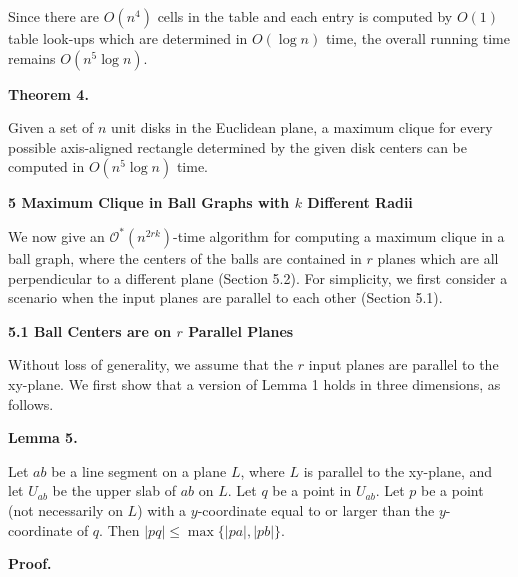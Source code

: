 \documentclass[10pt,a4paper]{amsart}
\begin{document}
\par
Since there are $O(n^{4})$ cells in the table and each entry is computed by $O(1)$ table look-ups which are determined in $O(\log n)$ time, the overall running time remains $O(n^{5}\log n)$.
\par
\par
\par\medskip\noindent\textbf{Theorem 4.}\par
Given a set of $n$ unit disks in the Euclidean plane, a maximum clique for every possible axis-aligned rectangle determined by the given disk centers can be computed in $O(n^{5}\log n)$ time.
\par
\par
\par
\par\medskip\noindent\textbf{5 Maximum Clique in Ball Graphs with $k$ Different Radii}\par
We now give an $\mathcal{O}^{*}(n^{2rk})$-time algorithm for computing a maximum clique in a ball graph, where the centers of the balls are contained in $r$ planes which are all perpendicular to a different plane (Section 5.2). For simplicity, we first consider a scenario when the input planes are parallel to each other (Section 5.1).
\par
\par
\par\medskip\noindent\textbf{5.1 Ball Centers are on $r$ Parallel Planes}\par
Without loss of generality, we assume that the $r$ input planes are parallel to the xy-plane. We first show that a version of Lemma 1 holds in three dimensions, as follows.
\par
\par
\par\medskip\noindent\textbf{Lemma 5.}\par
Let $ab$ be a line segment on a plane $L$, where $L$ is parallel to the xy-plane, and let $U_{ab}$ be the upper slab of $ab$ on $L$. Let $q$ be a point in $U_{ab}$. Let $p$ be a point (not necessarily on $L$) with a $y$-coordinate equal to or larger than the $y$-coordinate of $q$. Then $|pq|\leq\max\{|pa|,|pb|\}$.
\par
\par
\par
\par\medskip\noindent\textbf{Proof.}\par
\end{document}
